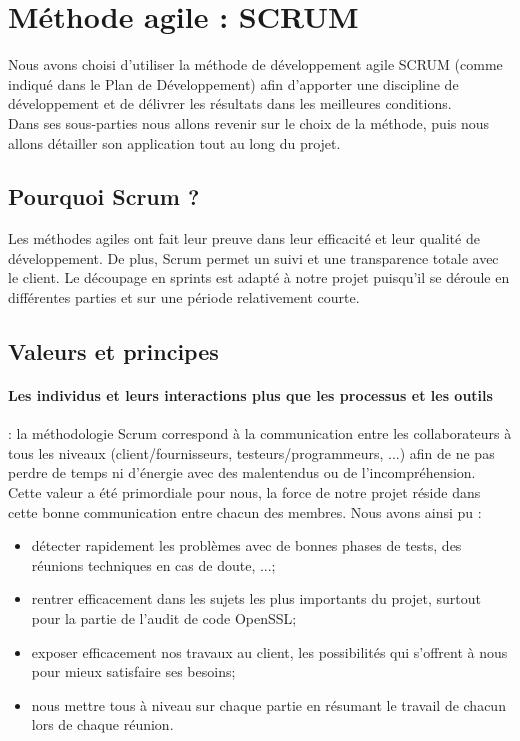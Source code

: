 \section{Méthode agile : SCRUM}

Nous avons choisi d'utiliser la méthode de développement agile SCRUM (comme indiqué dans le Plan de Développement) afin d’apporter une discipline de développement et de délivrer les résultats dans les meilleures conditions.\\
Dans ses sous-parties nous allons revenir sur le choix de la méthode, puis nous allons détailler son application tout au long du projet.

\subsection{Pourquoi Scrum ?}

Les méthodes agiles ont fait leur preuve dans leur efficacité et leur qualité de développement. De plus, Scrum permet un suivi et une transparence totale avec le client. Le découpage en sprints est adapté à notre projet puisqu’il se déroule en différentes parties et sur une période relativement courte.

\subsection{Valeurs et principes}

\paragraph{Les individus et leurs interactions plus que les processus et les outils} : la méthodologie Scrum correspond à la communication entre les collaborateurs à tous les niveaux (client/fournisseurs, testeurs/programmeurs, ...) afin de ne pas perdre de temps ni d’énergie avec des malentendus ou de l’incompréhension.\\

Cette valeur a été primordiale pour nous, la force de notre projet réside dans cette bonne communication entre chacun des membres.
Nous avons ainsi pu :
\begin{itemize}
\item détecter rapidement les problèmes avec de bonnes phases de tests, des réunions techniques en cas de doute, ...;
\item rentrer efficacement dans les sujets les plus importants du projet, surtout pour la partie de l'audit de code OpenSSL;
\item exposer efficacement nos travaux au client, les possibilités qui s'offrent à nous pour mieux satisfaire ses besoins;
\item nous mettre tous à niveau sur chaque partie en résumant le travail de chacun lors de chaque réunion.\\
\end{itemize}


